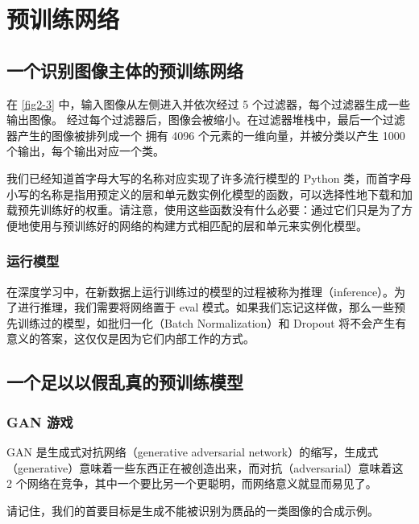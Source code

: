 \chapter{预训练网络\label{Ch02}}
\section{一个识别图像主体的预训练网络}
在 \autoref{fig2-3} 中，输入图像从左侧进入并依次经过 5 个过滤器，每个过滤器生成一些输出图像。
经过每个过滤器后，图像会被缩小。在过滤器堆栈中，最后一个过滤器产生的图像被排列成一个
拥有 4096 个元素的一维向量，并被分类以产生 1000 个输出，每个输出对应一个类。

我们已经知道首字母大写的名称对应实现了许多流行模型的 Python 类，而首字母小写的名称是指用预定义的层和单元数实例化模型的函数，可以选择性地下载和加载预先训练好的权重。请注意，使用这些函数没有什么必要：通过它们只是为了方便地使用与预训练好的网络的构建方式相匹配的层和单元来实例化模型。

\subsection{运行模型}
在深度学习中，在新数据上运行训练过的模型的过程被称为推理（inference）。为了进行推理，我们需要将网络置于 eval 模式。如果我们忘记这样做，那么一些预先训练过的模型，如批归一化（Batch Normalization）和 Dropout 将不会产生有意义的答案，这仅仅是因为它们内部工作的方式。

\section{一个足以以假乱真的预训练模型}
\subsection{GAN 游戏}
GAN 是生成式对抗网络（generative adversarial network）的缩写，生成式（generative）意味着一些东西正在被创造出来，而对抗（adversarial）意味着这 2 个网络在竞争，其中一个要比另一个更聪明，而网络意义就显而易见了。

请记住，我们的首要目标是生成不能被识别为赝品的一类图像的合成示例。

